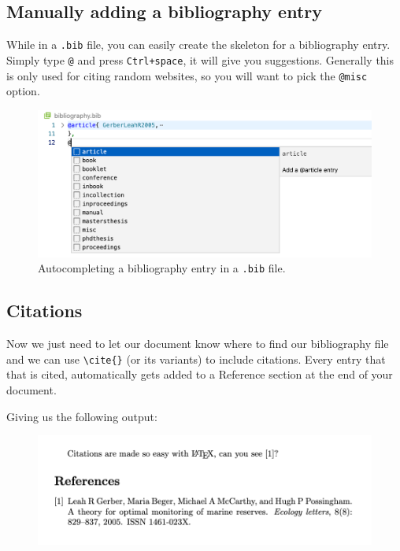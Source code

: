 \subsection{Manually adding a bibliography entry}
While in a \verb|.bib| file, you can easily create the skeleton for a bibliography entry.
Simply type \verb|@| and press \verb|Ctrl+space|, it will give you suggestions.
Generally this is only used for citing random websites, so you will want to pick the \verb|@misc| option.
\begin{figure}[h]
  \centering
    \includegraphics[width=\textwidth]{figures/bib-entry.png}
  \caption{Autocompleting a bibliography entry in a \texttt{.bib} file.}
  \label{fig:bib-entry}
\end{figure}

\subsection{Citations}
Now we just need to let our document know where to find our bibliography file and we can use \verb|\cite{}| (or its variants) to include citations.
Every entry that that is cited, automatically gets added to a Reference section at the end of your document.


Giving us the following output:
\begin{figure}[h]
  \centering
    \includegraphics[]{figures/references.png}
  \label{fig:references}
\end{figure}


